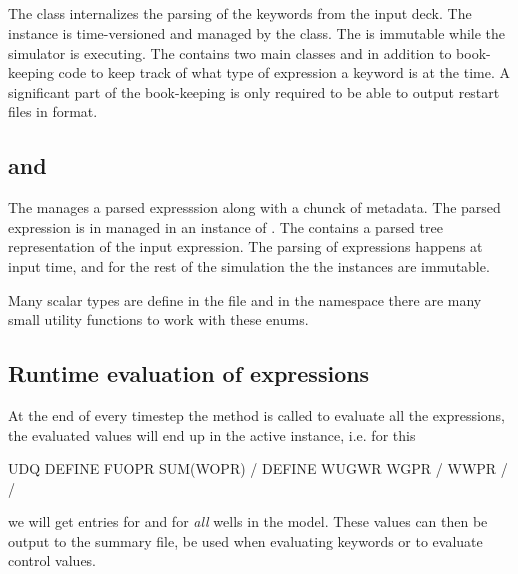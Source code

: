 \subsection*{}
The class  internalizes the parsing of the \udq{} keywords
from the input deck. The  instance is time-versioned and
managed by the  class. The  is
immutable while the simulator is executing. The  contains
two main classes  and  in addition
to book-keeping code to keep track of what type of expression a \udq{} keyword
is at the time. A significant part of the book-keeping is only required to be
able to output restart files in \eclipse{} format.

\subsection*{ and }
The  manages a parsed \udq{} expresssion along with a
chunck of metadata. The parsed \udq{} expression is in managed in an instance of
. The  contains a parsed tree
representation of the \udq{} input expression. The parsing of \udq{} expressions
happens at input time, and for the rest of the simulation the the
 instances are immutable.

Many scalar \udq{} types are define in the file  and in the
namespace  there are many small utility functions to work with
these enums.


\subsection*{Runtime evaluation of \udq{} expressions}
At the end of every timestep the  method is called
to evaluate all the \udq{} expressions, the evaluated values will end up in the
active  instance, i.e. for this \udq{}
\begin{deck}
UDQ
  DEFINE FUOPR SUM(WOPR) /
  DEFINE WUGWR WGPR / WWPR /
/
\end{deck}
we will get  entries for  and  for
\emph{all} wells in the model. These  values can then
be output to the summary file, be used when evaluating  keywords or
to evaluate  control values.

